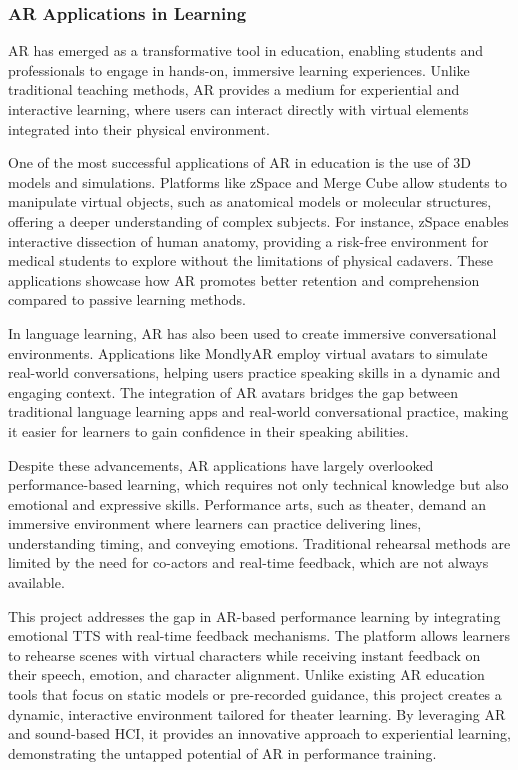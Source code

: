 \subsubsection{AR Applications in Learning}
AR has emerged as a transformative tool in education, enabling students and professionals to engage in hands-on, immersive learning experiences. Unlike traditional teaching methods, AR provides a medium for experiential and interactive learning, where users can interact directly with virtual elements integrated into their physical environment.

One of the most successful applications of AR in education is the use of 3D models and simulations. Platforms like zSpace\cite{zspace} and Merge Cube\cite{mergecube} allow students to manipulate virtual objects, such as anatomical models or molecular structures, offering a deeper understanding of complex subjects. For instance, zSpace enables interactive dissection of human anatomy, providing a risk-free environment for medical students to explore without the limitations of physical cadavers. These applications showcase how AR promotes better retention and comprehension compared to passive learning methods.

In language learning, AR has also been used to create immersive conversational environments. Applications like MondlyAR\cite{mondlyar} employ virtual avatars to simulate real-world conversations, helping users practice speaking skills in a dynamic and engaging context. The integration of AR avatars bridges the gap between traditional language learning apps and real-world conversational practice, making it easier for learners to gain confidence in their speaking abilities.

Despite these advancements, AR applications have largely overlooked performance-based learning, which requires not only technical knowledge but also emotional and expressive skills. Performance arts, such as theater, demand an immersive environment where learners can practice delivering lines, understanding timing, and conveying emotions. Traditional rehearsal methods are limited by the need for co-actors and real-time feedback, which are not always available\cite{azuma1997survey, billinghurst2015survey}.

This project addresses the gap in AR-based performance learning by integrating emotional TTS with real-time feedback mechanisms. The platform allows learners to rehearse scenes with virtual characters while receiving instant feedback on their speech, emotion, and character alignment. Unlike existing AR education tools that focus on static models or pre-recorded guidance, this project creates a dynamic, interactive environment tailored for theater learning. By leveraging AR and sound-based HCI, it provides an innovative approach to experiential learning, demonstrating the untapped potential of AR in performance training.

